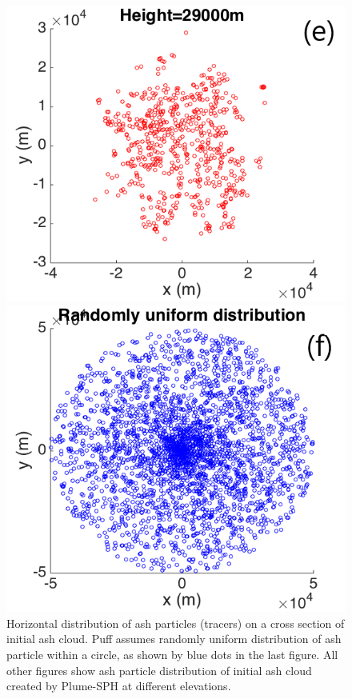 \documentclass[draft,linenumbers]{agujournal2019}
\begin{document}
\begin{figure}[!htb]
\begin{minipage}{.325 \textwidth}
    \end{minipage}%
    \begin{minipage}{.325 \textwidth}
        \centering
        \includegraphics[width=0.99 \textwidth]{Figures/Possion-H29km-ParticleDis-h}
    \end{minipage}%
    \begin{minipage}{.325 \textwidth}
        \centering
        \includegraphics[width=0.99 \textwidth]{Figures/Possion-RDU-ParticleDis-h}
    \end{minipage}%
    \caption{Horizontal distribution of ash particles (tracers) on a cross section of initial ash cloud. Puff assumes randomly uniform distribution of ash particle within a circle, as shown by blue dots in the last figure. All other figures show ash particle distribution of initial ash cloud created by Plume-SPH at different elevations.}
    \label{fig:initial-cloud-horizontal}
\end{figure}
\end{document}
